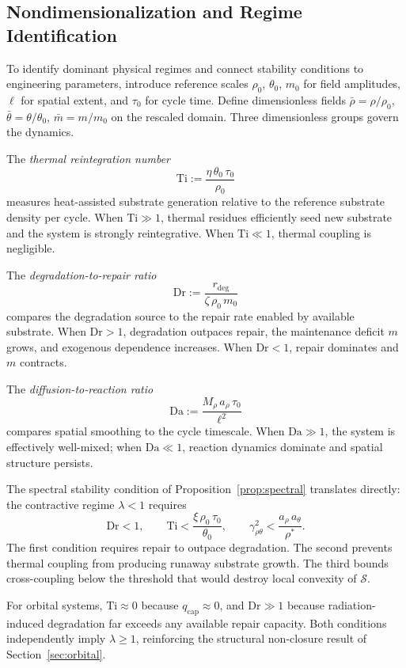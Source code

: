 \documentclass[10pt,twocolumn]{article}
\theoremstyle{plain}
\theoremstyle{definition}
\theoremstyle{remark}
\begin{document}
\subsection{Nondimensionalization and Regime Identification}

To identify dominant physical regimes and connect stability conditions
to engineering parameters, introduce reference scales $\rho_0$,
$\theta_0$, $m_0$ for field amplitudes, $\ell$ for spatial extent, and
$\tau_0$ for cycle time. Define dimensionless fields $\bar\rho =
\rho/\rho_0$, $\bar\theta = \theta/\theta_0$, $\bar m = m/m_0$ on
the rescaled domain. Three dimensionless groups govern the dynamics.

The \emph{thermal reintegration number}
\[
  \mathrm{Ti} := \frac{\eta\,\theta_0\,\tau_0}{\rho_0}
\]
measures heat-assisted substrate generation relative to the reference
substrate density per cycle. When $\mathrm{Ti} \gg 1$, thermal residues
efficiently seed new substrate and the system is strongly reintegrative.
When $\mathrm{Ti} \ll 1$, thermal coupling is negligible.

The \emph{degradation-to-repair ratio}
\[
  \mathrm{Dr} := \frac{r_{\mathrm{deg}}}{\zeta\,\rho_0\,m_0}
\]
compares the degradation source to the repair rate enabled by available
substrate. When $\mathrm{Dr} > 1$, degradation outpaces repair,
the maintenance deficit $m$ grows, and exogenous dependence increases.
When $\mathrm{Dr} < 1$, repair dominates and $m$ contracts.

The \emph{diffusion-to-reaction ratio}
\[
  \mathrm{Da} := \frac{M_\rho\, a_\rho\, \tau_0}{\ell^2}
\]
compares spatial smoothing to the cycle timescale. When
$\mathrm{Da} \gg 1$, the system is effectively well-mixed; when
$\mathrm{Da} \ll 1$, reaction dynamics dominate and spatial structure
persists.

The spectral stability condition of Proposition~\ref{prop:spectral}
translates directly: the contractive regime $\lambda < 1$ requires
\[
  \mathrm{Dr} < 1,
  \qquad
  \mathrm{Ti} < \frac{\xi\,\rho_0\,\tau_0}{\theta_0},
  \qquad
  \gamma_{\rho\theta}^2 < \frac{a_\rho\,a_\theta}{\rho^*}.
\]
The first condition requires repair to outpace degradation. The second
prevents thermal coupling from producing runaway substrate growth. The
third bounds cross-coupling below the threshold that would destroy local
convexity of $\mathcal{S}$.

For orbital systems, $\mathrm{Ti} \approx 0$ because $q_{\mathrm{cap}}
\approx 0$, and $\mathrm{Dr} \gg 1$ because radiation-induced
degradation far exceeds any available repair capacity. Both conditions
independently imply $\lambda \geq 1$, reinforcing the structural
non-closure result of Section~\ref{sec:orbital}.
\end{document}
